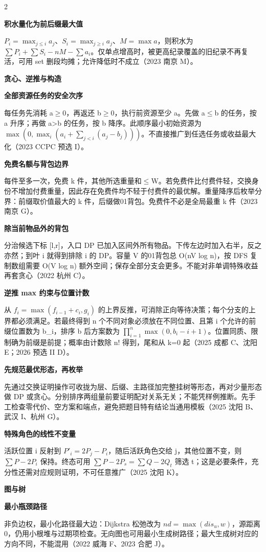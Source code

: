 \documentclass[UTF8,fontset=fandol,a4paper,twoside]{ctexart}
\newcommand{\topic}[1]{\par\smallskip\textbf{#1}\par\nobreak}
\newcommand{\note}[1]{{\fontsize{10}{12}\selectfont #1\par}}
\begin{document}
\begin{multicols}{2}
\par\textbf{积水量化为前后缀最大值}\quad
\note{$P_i=\max_{j\le i}a_j$、$S_i=\max_{j\ge i}a_j$、$M=\max a$，则积水为 $\sum P_i+\sum S_i-nM-\sum a_i$。仅单点增高时，被更高纪录覆盖的旧纪录不再复活，可用 set 删段均摊；允许降低时不成立（2023 南京 M）。}
\topic{贪心、逆推与构造}
\par\textbf{全部资源任务的安全次序}\quad
\note{每任务先消耗 a\ensuremath{\ge}0，再返还 b\ensuremath{\ge}0，执行前资源至少 a。先做 a\ensuremath{\le}b 的任务，按 a 升序；再做 a>\allowbreak{}b 的任务，按 b 降序。此顺序最小初始资源为 $\max(0,\max_i(a_i+\sum_{j<i}(a_j-b_j)))$。不直接推广到任选任务或收益最大化（2023 CCPC 预选 I）。}
\par\textbf{免费名额与背包边界}\quad
\note{每件至多一次，免费 k 件，其他所选重量和\ensuremath{\le}W。若免费件比付费件轻，交换身份不增加付费重量，因此存在免费件均不轻于付费件的最优解。重量降序后枚举分界：前缀取价值最大的 k 件，后缀做01背包。免费件不必是全局最重 k 件（2023 南京 G）。}
\par\textbf{除当前物品外的背包}\quad
\note{分治候选下标 [\allowbreak{}l,\allowbreak{}r]\allowbreak{}，入口 DP 已加入区间外所有物品。下传左边时加入右半，反之亦然；到叶 i 就得到排除 i 的 DP。容量 V 的01背包总 O(\allowbreak{}nV log n)\allowbreak{}，按 DFS 复制数组需要 O(\allowbreak{}V log n)\allowbreak{} 额外空间；保存全部分支会更多。不能对非单调特殊收益再套贪心（2022 杭州 C）。}
\par\textbf{逆推 max 约束与位置计数}\quad
\note{从 $f_i=\max(f_{i-1}+c_i,g_i)$ 的上界反推，可消除正向等待决策；每个分支的上界都必须满足。若最终得到 n 个不同对象必须放在不同位置、且第 i 个允许的前缀位置数为 b\_i，排序 b 后方案数为 $\prod_{i=1}^n\max(0,b_i-i+1)$。位置同质、限制确为前缀是前提；概率由计数除 n! 得到，尾和从 k=\allowbreak{}0 起（2025 成都 C、沈阳 E；2026 预选 II D）。}
\par\textbf{先规范最优形态，再枚举}\quad
\note{先通过交换证明操作可收拢为层、后缀、主路径加完整挂树等形态，再对少量形态做 DP 或贪心。分别排序两组量前要证明配对关系无关；不能凭样例推断。先手工检查零代价、空方案和端点，避免把题目特有结论当通用模板（2025 沈阳 B、武汉 I、杭州 G）。}
\par\textbf{特殊角色的线性不变量}\quad
\note{活跃位置 i 反射到 $P'_i=2P_j-P_i$，随后活跃角色交给 j，其他位置不变，则 $\sum P-2P_i$ 保持。终态可用 $\sum P-2P_s=\sum Q-2Q_t$ 筛选 t；这是必要条件，充分性还需对应规则证明，不可任意推广（2025 沈阳 K）。}
\topic{图与树}
\par\textbf{最小瓶颈路径}\quad
\note{非负边权，最小化路径最大边：Dijkstra 松弛改为 $nd=\max(dis_u,w)$，源距离0，仍用小根堆与过期项检查。无向图也可用最小生成树路径；最大生成树对应的方向不同，不能混用（2022 威海 F、2023 合肥 J）。}

\end{multicols}
\end{document}
